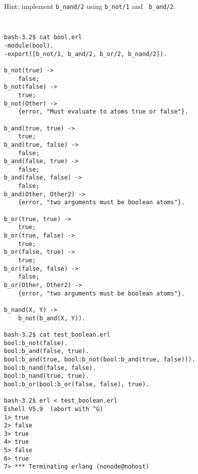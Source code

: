 \begin{questions}
    Hint: implement {\tt b\_nand/2} using {\tt b\_not/1} and {\tt
    b\_and/2}.  

    \begin{solution}
    {\tt
\begin{verbatim}
bash-3.2$ cat bool.erl 
-module(bool).
-export([b_not/1, b_and/2, b_or/2, b_nand/2]).

b_not(true) ->
    false;
b_not(false) ->
    true;
b_not(Other) ->
    {error, "Must evaluate to atoms true or false"}.

b_and(true, true) ->
    true;
b_and(true, false) ->
    false;
b_and(false, true) ->
    false;
b_and(false, false) ->
    false;
b_and(Other, Other2) ->
    {error, "two arguments must be boolean atoms"}.

b_or(true, true) ->
    true;
b_or(true, false) ->
    true;
b_or(false, true) ->
    true;
b_or(false, false) ->
    false;
b_or(Other, Other2) ->
    {error, "two arguments must be boolean atoms"}.

b_nand(X, Y) ->
    b_not(b_and(X, Y)).

bash-3.2$ cat test_boolean.erl 
bool:b_not(false).
bool:b_and(false, true).
bool:b_and(true, bool:b_not(bool:b_and(true, false))).
bool:b_nand(false, false).
bool:b_nand(true, true).
bool:b_or(bool:b_or(false, false), true).

bash-3.2$ erl < test_boolean.erl 
Eshell V5.9  (abort with ^G)
1> true
2> false
3> true
4> true
5> false
6> true
7> *** Terminating erlang (nonode@nohost)
\end{verbatim}
        }
        
\end{solution}
\end{questions}


